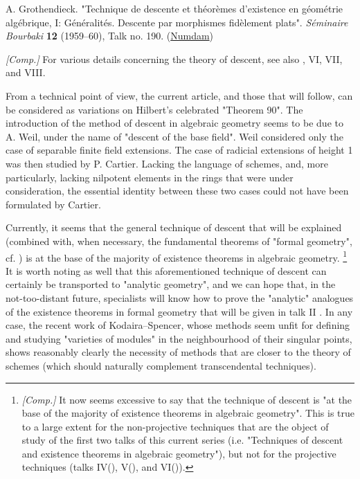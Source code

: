 
A. Grothendieck.
"Technique de descente et théorèmes d'existence en géométrie algébrique, I: Généralités. Descente par morphismes fidèlement plats".
\emph{Séminaire Bourbaki} \textbf{12} (1959–60), Talk no. 190.
(\href{http://www.numdam.org/book-part/SB_1958-1960__5__299_0/}{Numdam})



\emph{[Comp.]}
For various details concerning the theory of descent, see also \cite{Gro1960b}, VI, VII, and VIII.



From a technical point of view, the current article, and those that will follow, can be considered as variations on Hilbert's celebrated "Theorem 90".
The introduction of the method of descent in algebraic geometry seems to be due to A. Weil, under the name of "descent of the base field".
Weil considered only the case of separable finite field extensions.
The case of radicial extensions of height 1 was then studied by P. Cartier.
Lacking the language of schemes, and, more particularly, lacking nilpotent elements in the rings that were under consideration, the essential identity between these two cases could not have been formulated by Cartier.

Currently, it seems that the general technique of descent that will be explained (combined with, when necessary, the fundamental theorems of "formal geometry", cf. ) is at the base of the majority of existence theorems in algebraic geometry.
\footnote{\emph{[Comp.]} It now seems excessive to say that the technique of descent is "at the base of the majority of existence theorems in algebraic geometry". This is true to a large extent for the non-projective techniques that are the object of study of the first two talks of this current series (i.e. "Techniques of descent and existence theorems in algebraic geometry"), but not for the projective techniques (talks IV(), V(), and VI()).}
It is worth noting as well that this aforementioned technique of descent can certainly be transported to "analytic geometry", and we can hope that, in the not-too-distant future, specialists will know how to prove the "analytic" analogues of the existence theorems in formal geometry that will be given in talk II .
In any case, the recent work of Kodaira–Spencer, whose methods seem unfit for defining and studying "varieties of modules" in the neighbourhood of their singular points, shows reasonably clearly the necessity of methods that are closer to the theory of schemes (which should naturally complement transcendental techniques).


